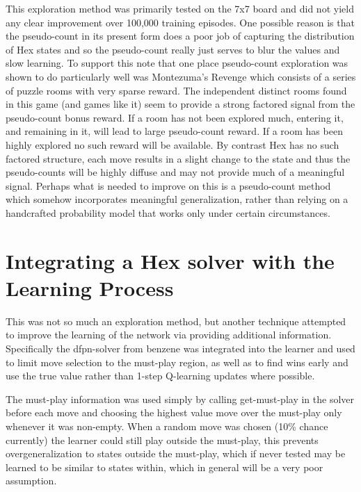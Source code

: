 \documentclass{article}
\begin{document}
This exploration method was primarily tested on the 7x7 board and did not yield any clear improvement over 100,000 training episodes. One possible reason is that the pseudo-count in its present form does a poor job of capturing the distribution of Hex states and so the pseudo-count really just serves to blur the values and slow learning. To support this note that one place pseudo-count exploration was shown to do particularly well was Montezuma's Revenge which consists of a series of puzzle rooms with very sparse reward. The independent distinct rooms found in this game (and games like it) seem to provide a strong factored signal from the pseudo-count bonus reward. If a room has not been explored much, entering it, and remaining in it, will lead to large pseudo-count reward. If a room has been highly explored no such reward will be available. By contrast Hex has no such factored structure, each move results in a slight change to the state and thus the pseudo-counts will be highly diffuse and may not provide much of a meaningful signal. Perhaps what is needed to improve on this is a pseudo-count method which somehow incorporates meaningful generalization, rather than relying on a handcrafted probability model that works only under certain circumstances.

\section*{Integrating a Hex solver with the Learning Process}
This was not so much an exploration method, but another technique attempted to improve the learning of the network via providing additional information. Specifically the dfpn-solver from benzene\cite{solhex}\cite{dfpn} was integrated into the learner and used to limit move selection to the must-play region, as well as to find wins early and use the true value rather than 1-step Q-learning updates where possible. 

The must-play information was used simply by calling get-must-play in the solver before each move and choosing the highest value move over the must-play only whenever it was non-empty. When a random move was chosen (10\% chance currently) the learner could still play outside the must-play, this prevents overgeneralization to states outside the must-play, which if never tested may be learned to be similar to states within, which in general will be a very poor assumption. 
\end{document}
